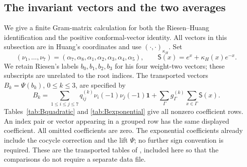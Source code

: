 \documentclass[11pt,reqno]{amsart}
\theoremstyle{definition}\newtheorem{definition}[theorem]{Definition}
\theoremstyle{remark}\newtheorem{remark}[theorem]{Remark}
\newcommand{\one}{\mathbf1}\newcommand{\slc}{\mathfrak{sl}_2}
\numberwithin{equation}{section}
\begin{document}
\subsection{The invariant vectors and the two averages}\label{app:invariants}
We give a finite Gram-matrix calculation for both the Riesen--Huang identification and the positive conformal-vector identity. All vectors in this subsection are in Huang's coordinates and use $(\cdot,\cdot)_{\kappa_H}$. Set
\[
 (\nu_1,\ldots,\nu_7)=(\alpha_7,\alpha_8,\alpha_1,\alpha_2,\alpha_3,\alpha_4,\alpha_5),
 \qquad \mathsf S(x)=e^x+\kappa_H(x)e^{-x}.
\]
We retain Riesen's labels $b_0,b_1,b_2,b_3$ for his four weight-two vectors; these subscripts are unrelated to the root indices. The transported vectors $B_k=\Psi(b_k)$, $0\le k\le3$, are specified by
\begin{equation}\label{eq:Btables}
 B_k=\sum_{1\le i\le j\le7}q_{ij}^{(k)}\nu_i(-1)\nu_j(-1)\one
       +\sum_{\Gamma}g_\Gamma^{(k)}\sum_{x\in\Gamma}\mathsf S(x).
\end{equation}
Tables~\ref{tab:Bquadratic} and \ref{tab:Bexponential} give all nonzero coefficient rows. An index pair or vector appearing in a grouped row has the same displayed coefficient. All omitted coefficients are zero. The exponential coefficients already include the cocycle correction and the lift $\Psi$; no further sign convention is required. These are the transported tables of \cite[Appendix C]{RiesenLong}, included here so that the comparisons do not require a separate data file.
\end{document}
